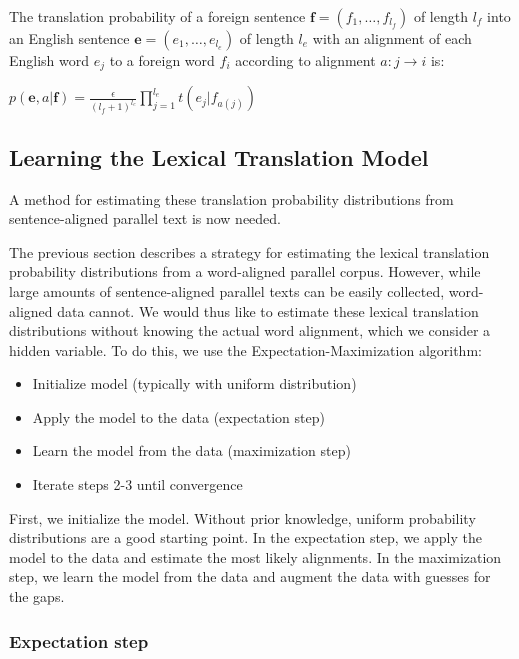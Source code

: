 \documentclass[11pt]{report}
\theoremstyle{plain}
\begin{document}
{The translation probability of a foreign sentence
$\textbf{f}=(f_1,\dots,f_{l_f})$ of length $l_f$ into an English
sentence $\textbf{e}=(e_1,\dots, e_{l_e})$ of length $l_e$ with an
alignment of each English word $e_j$ to a foreign word $f_i$
according to alignment $a:j \rightarrow i$ is:

\begin{center}
$p(\textbf{e},a|\textbf{f}) = \frac{\epsilon}{(l_f +
1)^{l_e}}\prod_{j=1}^{l_e} t(e_j|f_{a(j)})$
\end{center}


\subsection{Learning the Lexical Translation Model}

A method for estimating these translation probability distributions
from sentence-aligned parallel text is now needed.

The previous section describes a strategy for estimating the lexical
translation probability distributions from a word-aligned parallel
corpus. However, while large amounts of sentence-aligned parallel
texts can be easily collected, word-aligned data cannot. We would
thus like to estimate these lexical translation distributions
without knowing the actual word alignment, which we consider a
hidden variable. To do this, we use the Expectation-Maximization
algorithm:
\vspace{-3pt}
{
\begin{itemize} \itemsep=-3pt
\item{Initialize model (typically with uniform distribution)}
\item{Apply the model to the data (expectation step)}
\item{Learn the model from the data (maximization step)}
\item{Iterate steps 2-3 until convergence}
\end{itemize}
}

First, we initialize the model. Without prior knowledge, uniform
probability distributions are a good starting point. In the
expectation step, we apply the model to the data and estimate the
most likely alignments. In the maximization step, we learn the model
from the data and augment the data with guesses for the gaps.

\subsubsection{Expectation step}

}
\end{document}
